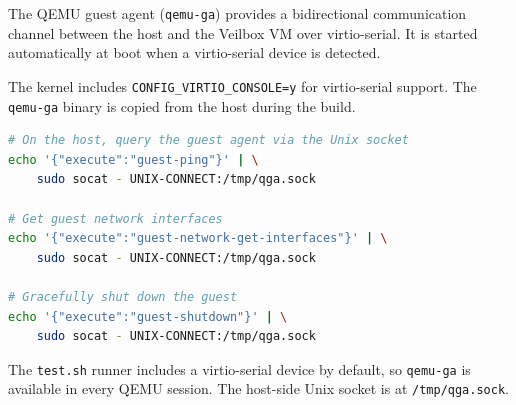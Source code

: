 The QEMU guest agent (\texttt{qemu-ga}) provides a bidirectional
communication channel between the host and the Veilbox VM over
virtio-serial. It is started automatically at boot when a
virtio-serial device is detected.

The kernel includes \texttt{CONFIG\_VIRTIO\_CONSOLE=y} for virtio-serial
support. The \texttt{qemu-ga} binary is copied from the host during
the build.

\begin{lstlisting}[language=bash]
# On the host, query the guest agent via the Unix socket
echo '{"execute":"guest-ping"}' | \
    sudo socat - UNIX-CONNECT:/tmp/qga.sock

# Get guest network interfaces
echo '{"execute":"guest-network-get-interfaces"}' | \
    sudo socat - UNIX-CONNECT:/tmp/qga.sock

# Gracefully shut down the guest
echo '{"execute":"guest-shutdown"}' | \
    sudo socat - UNIX-CONNECT:/tmp/qga.sock
\end{lstlisting}

The \texttt{test.sh} runner includes a virtio-serial device by default,
so \texttt{qemu-ga} is available in every QEMU session. The host-side
Unix socket is at \texttt{/tmp/qga.sock}.

